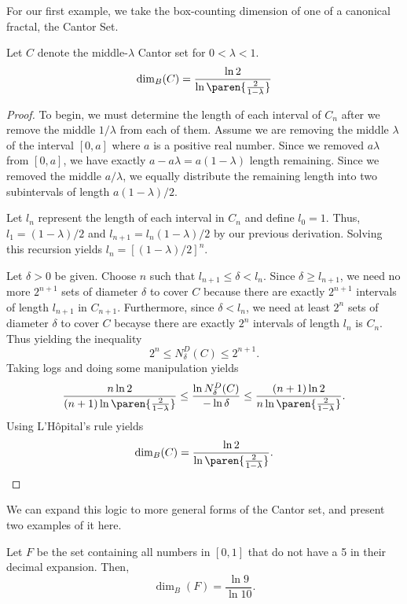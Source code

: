 For our first example, we take the box-counting dimension of one of a canonical fractal, the Cantor Set.

\begin{example}
	Let $C$ denote the middle-$\lambda$ Cantor set for $0<\lambda < 1$.
	\[
		\dim_B(C)=\frac{\ln2}{\ln\paren{\frac{2}{1-\lambda}}}
	\]
\end{example}
\begin{proof}
	To begin, we must determine the length of each interval of $C_n$ after we remove the middle $1/\lambda$ from each of them.
	Assume we are removing the middle $\lambda$ of the interval $[0,a]$ where $a$ is a positive real number.
	Since we removed $a\lambda$ from $[0,a]$, we have exactly $a-a\lambda=a(1-\lambda)$ length remaining.
	Since we removed the middle $a/\lambda$, we equally distribute the remaining length into two subintervals of length $a(1-\lambda)/2$.
	
	Let $l_n$ represent the length of each interval in $C_n$ and define $l_0=1$.
	Thus, $l_1=(1-\lambda)/2$ and $l_{n+1}=l_n(1-\lambda)/2$ by our previous derivation.
	Solving this recursion yields $l_n=[(1-\lambda)/2]^n$.
	
	Let $\delta>0$ be given.
	Choose $n$ such that $l_{n+1}\leq\delta< l_n$.
	Since $\delta \geq l_{n+1}$, we need no more $2^{n+1}$ sets of diameter $\delta$ to cover $C$ because there are exactly $2^{n+1}$ intervals of length $l_{n+1}$ in $C_{n+1}$.
	Furthermore, since $\delta < l_n$, we need at least $2^n$ sets of diameter $\delta$ to cover $C$ becayse there are exactly $2^n$ intervals of length $l_n$ is $C_n$.
	Thus yielding the inequality
	\[
	2^n \leq N^D_\delta(C) \leq 2^{n+1}.
	\]
	Taking logs and doing some manipulation yields
	\[
		\frac{n\ln2}{(n+1)\ln \paren{\frac{2}{1-\lambda}}}\leq\frac{\ln N^D_\delta(C)}{-\ln\delta}\leq\frac{(n+1)\ln2}{n\ln \paren{\frac{2}{1-\lambda}}}.
	\]
	Using L'H\^{o}pital's rule yields
	\[
		\dim_B(C)=\frac{\ln2}{\ln\paren{\frac{2}{1-\lambda}}}.
	\]
\end{proof}

We can expand this logic to more general forms of the Cantor set, and present two examples of it here.

\begin{example}
	Let $F$ be the set containing all numbers in $[0,1]$ that do not have a 5 in their decimal expansion.
	Then,
	\[
		\dim_B(F)=\frac{\ln9}{\ln10}.
	\]
\end{example}

